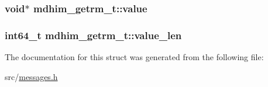 \hypertarget{structmdhim__getrm__t_ae1e2ce047de1164dcdb1bcfe0f6fd0ae}{
\subsubsection[{value}]{\setlength{\rightskip}{0pt plus 5cm}void$\ast$ mdhim\-\_\-getrm\-\_\-t\-::value}}\label{d5/dfb/structmdhim__getrm__t_ae1e2ce047de1164dcdb1bcfe0f6fd0ae}
\hypertarget{structmdhim__getrm__t_aecda310ffb073b7d783fd52beee37d51}{
\subsubsection[{value\-\_\-len}]{\setlength{\rightskip}{0pt plus 5cm}int64\-\_\-t mdhim\-\_\-getrm\-\_\-t\-::value\-\_\-len}}\label{d5/dfb/structmdhim__getrm__t_aecda310ffb073b7d783fd52beee37d51}


The documentation for this struct was generated from the following file\-:\begin{DoxyCompactItemize}
\item 
src/\hyperlink{messages_8h}{messages.\-h}\end{DoxyCompactItemize}
